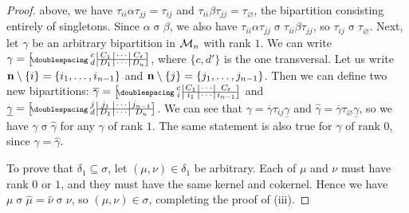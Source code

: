 \begin{lemma}
\begin{proof}
    above, we have
    $\tau_{ii}\alpha\tau_{jj}= \tau_{ij}$ and
    $\tau_{ii}\beta\tau_{jj}= \tau_\varnothing$, the bipartition consisting
    entirely of singletons.  Since $\alpha \mathrel\sigma \beta$, we also have
    $\tau_{ii}\alpha\tau_{jj} \mathrel\sigma \tau_{ii}\beta\tau_{jj}$, so
    $\tau_{ij} \mathrel\sigma \tau_\varnothing$.
    Next, let $\gamma$ be an arbitrary bipartition in $\mathcal{M}_n$ with rank $1$.
    We can write
    $\gamma = \bipart{c|c|c|c}{2-4}
    {c & C_1 & \cdots & C_t}{d & D_1 & \cdots & D_u}$,
    where $\{c,d'\}$ is the one transversal.  Let us write
    $\mathbf{n} \setminus \{i\} = \{i_1, \ldots, i_{n-1}\}$ and
    $\mathbf{n} \setminus \{j\} = \{j_1, \ldots, j_{n-1}\}$.  Then we can define two
    new bipartitions:
    $\overline\gamma = \bipart{c|c|c|c}{2-4}
    {c & C_1 & \cdots & C_t}{i & i_1 & \cdots & i_{n-1}}$ and
    $\underline\gamma = \bipart{c|c|c|c}{2-4}
    {j & j_1 & \cdots & j_{n-1}}{d & D_1 & \cdots & D_u}$.
    We can see that $\gamma = \overline\gamma \tau_{ij} \underline\gamma$ and
    $\widehat\gamma = \overline\gamma \tau_\varnothing \underline\gamma$, so
    we have $\gamma \mathrel\sigma \widehat\gamma$ for any $\gamma$ of rank
    $1$.  The same statement is also true for $\gamma$ of rank $0$, since
    $\gamma = \widehat\gamma$.

    To prove that $\delta_1 \subseteq \sigma$, let $(\mu, \nu) \in \delta_1$ be
    arbitrary.  Each of $\mu$ and $\nu$ must have rank $0$ or $1$, and they must
    have the same kernel and cokernel.  Hence we have
    $\mu \mathrel\sigma \widehat\mu = \widehat\nu \mathrel\sigma \nu$, so
    $(\mu, \nu) \in \sigma$, completing the proof of (iii).
  \end{proof}
\end{lemma}

